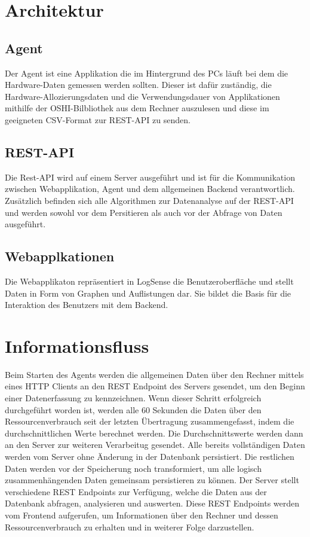 \documentclass{report}
\begin{document}
\section{Architektur}
\subsection{Agent}
Der Agent ist eine Applikation die im Hintergrund des PCs läuft bei dem die Hardware-Daten gemessen werden sollten. Dieser ist dafür zuständig, die Hardware-Allozierungsdaten und die Verwendungsdauer von Applikationen mithilfe der OSHI-Bilbliothek aus dem Rechner auszulesen und diese im geeigneten CSV-Format zur REST-API zu senden. 
\subsection{REST-API}
Die Rest-API wird auf einem Server ausgeführt und ist für die Kommunikation zwischen Webapplikation, Agent und dem allgemeinen Backend verantwortlich. Zusätzlich befinden sich alle Algorithmen zur Datenanalyse auf der REST-API und werden sowohl vor dem Persitieren als auch vor der Abfrage von Daten ausgeführt.
\subsection{Webapplkationen}
Die Webapplikaton repräsentiert in LogSense die Benutzeroberfläche und stellt Daten in Form von Graphen und Auflistungen dar. Sie bildet die Basis für die Interaktion des Benutzers mit dem Backend.
\section{Informationsfluss}
Beim Starten des Agents werden die allgemeinen Daten über den Rechner mittels eines HTTP Clients an den REST Endpoint des Servers gesendet, um den Beginn einer Datenerfassung zu kennzeichnen. Wenn dieser Schritt erfolgreich durchgeführt worden ist, werden alle 60 Sekunden die Daten über den Ressourcenverbrauch seit der letzten Übertragung zusammengefasst, indem die durchschnittlichen Werte berechnet werden. Die Durchschnittswerte werden dann an den Server zur weiteren Verarbeitug gesendet.
Alle bereits vollständigen Daten werden vom Server ohne Änderung in der Datenbank persistiert. Die restlichen Daten werden vor der Speicherung noch transformiert, um alle logisch zusammenhängenden Daten gemeinsam persistieren zu können.
Der Server stellt verschiedene REST Endpoints zur Verfügung, welche die Daten aus der Datenbank abfragen, analysieren und auswerten.
Diese REST Endpoints werden vom Frontend aufgerufen, um Informationen über den Rechner und dessen Ressourcenverbrauch zu erhalten und in weiterer Folge darzustellen.
\end{document}
